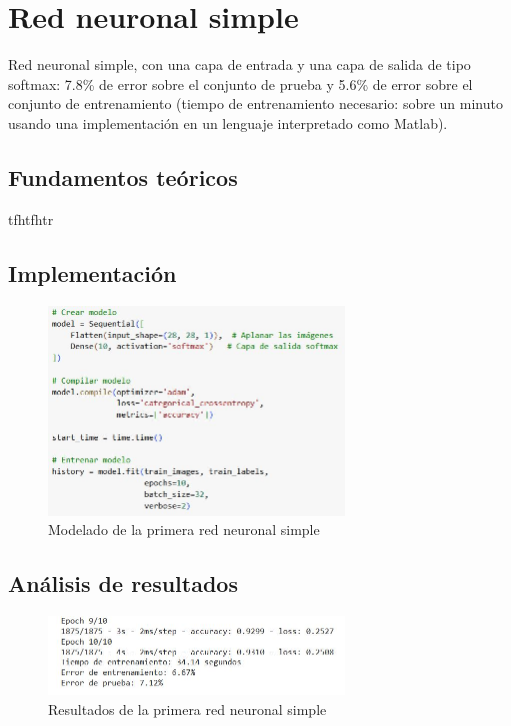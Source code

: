 \section{Red neuronal simple}

Red neuronal simple, con una capa de entrada y una capa de salida de tipo softmax:
7.8\% de error sobre el conjunto de prueba y 5.6\% de error sobre el conjunto de
entrenamiento (tiempo de entrenamiento necesario: sobre un minuto usando una
implementación en un lenguaje interpretado como Matlab).

\subsection{Fundamentos teóricos}

tfhtfhtr

\subsection{Implementación}

\begin{figure}[H]
	\centering
	\includegraphics[width=0.7\textwidth]{imgs/model-red1.JPG}
	\caption{Modelado de la primera red neuronal simple}
	\label{fig:model-red1}
\end{figure}


\subsection{Análisis de resultados}

\begin{figure}[H]
	\centering
	\includegraphics[width=0.7\textwidth]{imgs/results-red1.JPG}
	\caption{Resultados de la primera red neuronal simple}
	\label{fig:results-red1}
\end{figure}


